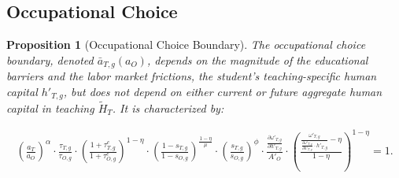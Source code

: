\documentclass[onehalfspacing,11pt]{article}
\newtheorem{prp}{Proposition}
\begin{document}
		\subsection{Occupational Choice}%
	
	
	\begin{prp}[Occupational Choice Boundary] The occupational choice boundary, denoted $\bar{a}_{T,g}(a_O)$, depends on the magnitude of the educational barriers and the labor market frictions, the student's teaching-specific human capital $h'_{T,g}$, but does not depend on either current or future aggregate human capital in teaching $\widetilde{H}_T$. It is characterized by:
		
		\begin{align}
			\label{eq:occChoice}
			\left(\frac{a_T}{a_O}\right)^\alpha \cdot \frac{\tau_{T,g}}{\tau_{O,g}} \cdot \left(\frac{1+\tau^e_{T,g}}{1+\tau^e_{O,g}}\right)^{1-\eta}  \cdot \left(\frac{1-s_{T,g}}{1-s_{O,g}}\right)^\frac{1-\eta}{\mu} \cdot \left(\frac{s_{T,g}}{s_{O,g}}\right)^\phi \cdot \frac{\frac{\partial \omega'_{T,g}}{\partial h'_{T,g}}}{A'_O} \cdot \left(\frac{ \frac{\omega'_{T,g}}{\frac{\partial \omega'_{T,g}}{\partial h'_{T,g}} \cdot h'_{T,g}}-\eta}{1-\eta}\right)^{1-\eta}=1.
		\end{align}
	\end{prp}
	
	
\end{document}
